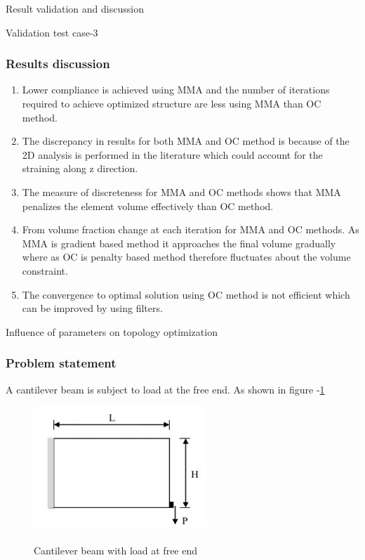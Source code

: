 \documentclass[a4paper,12pt,times]{article}
\begin{document}
\begin{section}{Result validation and discussion}
\begin{subsection}{Validation test case-3}
\subsubsection{Results discussion}
\begin{enumerate}
\item Lower compliance is achieved using MMA and the number of iterations required to achieve optimized structure are less using MMA than OC method.

\item The discrepancy in results for both MMA and OC method is because of the 2D analysis is performed in the literature which could account for the straining along z direction.

\item The measure of discreteness for MMA and OC methods shows that MMA penalizes the element volume effectively than OC method.

\item From volume fraction change at each iteration for MMA and OC methods. As MMA is gradient based method it approaches the final volume gradually where as OC is penalty based method therefore fluctuates about the volume constraint.

\item The convergence to optimal solution using OC method is not efficient which can be improved by using filters.
\end{enumerate}

\end{subsection}
\begin{subsection}{Influence of parameters on topology optimization}
\subsubsection{Problem statement}
A cantilever beam is subject to load at the free end. As shown in figure -\ref{fig:problem-1}
\begin{figure}[H]
	\begin{center}
		\includegraphics[scale=1.75]{Problem-1.png} 
		\caption{\\Cantilever beam with load at free end}\label{fig:problem-1}
	\end{center}	
\end{figure}



\end{subsection}
\end{section}
\end{document}
